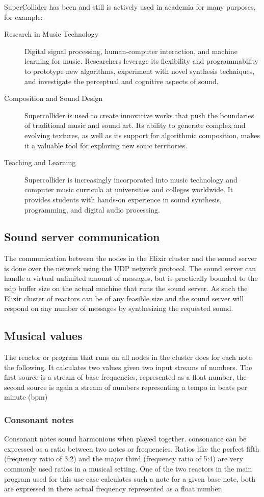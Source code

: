 \documentclass[a4paper]{book}
\begin{document}
SuperCollider has been and still is actively used in academia for many purposes, for example:
\begin{description}
	\item[Research in Music Technology] Digital signal processing, human-computer interaction, and machine learning for music. Researchers leverage its flexibility and programmability to prototype new algorithms, experiment with novel synthesis techniques, and investigate the perceptual and cognitive aspects of sound.
	\item[Composition and Sound Design] Supercollider is used to create innovative works that push the boundaries of traditional music and sound art. Its ability to generate complex and evolving textures, as well as its support for algorithmic composition, makes it a valuable tool for exploring new sonic territories.
	\item[Teaching and Learning] Supercollider is increasingly incorporated into music technology and computer music curricula at universities and colleges worldwide. It provides students with hands-on experience in sound synthesis, programming, and digital audio processing.

\end{description} 
\subsection{Sound server communication}
The communication between the nodes in the Elixir cluster and the sound server is done over the network using the UDP network protocol. The sound server can handle a virtual unlimited amount of messages, but is practically bounded to the udp buffer size on the actual machine that runs the sound server. As such the Elixir cluster of reactors can be of any feasible size and the sound server will respond on any number of messages by synthesizing the requested sound. 

\subsection{Musical values}
The reactor or program that runs on all nodes in the cluster does for each note the following. It calculates two values given two input streams of numbers. The first source is a stream of base frequencies, represented as a float number, the second source is again a stream of numbers representing a tempo in beats per minute (bpm)

\subsubsection*{Consonant notes}
Consonant notes sound harmonious when played together. consonance can be expressed as a ratio between two notes or frequencies. Ratios like the perfect fifth (frequency ratio of 3:2) and the major third (frequency ratio of 5:4) are very commonly used ratios in a musical setting. One of the two reactors in the main program used for this use case calculates such a note for a given base note, both are expressed in there actual frequency represented as a float number.
\end{document}
